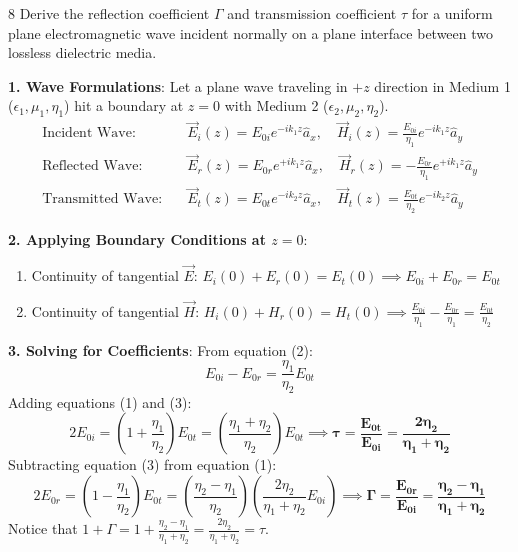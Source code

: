 \begin{theoryq}{8}
Derive the reflection coefficient $\Gamma$ and transmission coefficient $\tau$ for a uniform plane electromagnetic wave incident normally on a plane interface between two lossless dielectric media.
\end{theoryq}
\begin{theorysol}
\textbf{1. Wave Formulations}:
Let a plane wave traveling in $+z$ direction in Medium 1 ($\epsilon_1, \mu_1, \eta_1$) hit a boundary at $z=0$ with Medium 2 ($\epsilon_2, \mu_2, \eta_2$).
\begin{align*}
\text{Incident Wave:}\quad &\vec{E}_i(z) = E_{0i} e^{-i k_1 z}\hat{a}_x, \quad \vec{H}_i(z) = \frac{E_{0i}}{\eta_1} e^{-i k_1 z}\hat{a}_y \\
\text{Reflected Wave:}\quad &\vec{E}_r(z) = E_{0r} e^{+i k_1 z}\hat{a}_x, \quad \vec{H}_r(z) = -\frac{E_{0r}}{\eta_1} e^{+i k_1 z}\hat{a}_y \\
\text{Transmitted Wave:}\quad &\vec{E}_t(z) = E_{0t} e^{-i k_2 z}\hat{a}_x, \quad \vec{H}_t(z) = \frac{E_{0t}}{\eta_2} e^{-i k_2 z}\hat{a}_y
\end{align*}

\textbf{2. Applying Boundary Conditions at $z=0$}:
\begin{enumerate}
    \item Continuity of tangential $\vec{E}$: $E_i(0) + E_r(0) = E_t(0) \implies E_{0i} + E_{0r} = E_{0t}$
    \item Continuity of tangential $\vec{H}$: $H_i(0) + H_r(0) = H_t(0) \implies \frac{E_{0i}}{\eta_1} - \frac{E_{0r}}{\eta_1} = \frac{E_{0t}}{\eta_2}$
\end{enumerate}

\textbf{3. Solving for Coefficients}:
From equation (2):
\begin{equation}
E_{0i} - E_{0r} = \frac{\eta_1}{\eta_2} E_{0t}
\end{equation}
Adding equations (1) and (3):
\begin{equation}
2 E_{0i} = \left(1 + \frac{\eta_1}{\eta_2}\right)E_{0t} = \left(\frac{\eta_1 + \eta_2}{\eta_2}\right)E_{0t} \implies \mathbf{\tau = \frac{E_{0t}}{E_{0i}} = \frac{2\eta_2}{\eta_1 + \eta_2}}
\end{equation}
Subtracting equation (3) from equation (1):
\begin{equation}
2 E_{0r} = \left(1 - \frac{\eta_1}{\eta_2}\right)E_{0t} = \left(\frac{\eta_2 - \eta_1}{\eta_2}\right)\left(\frac{2\eta_2}{\eta_1 + \eta_2}E_{0i}\right) \implies \mathbf{\Gamma = \frac{E_{0r}}{E_{0i}} = \frac{\eta_2 - \eta_1}{\eta_1 + \eta_2}}
\end{equation}
Notice that $1 + \Gamma = 1 + \frac{\eta_2 - \eta_1}{\eta_1 + \eta_2} = \frac{2\eta_2}{\eta_1 + \eta_2} = \tau$.
\end{theorysol}
\vspace{4mm}

